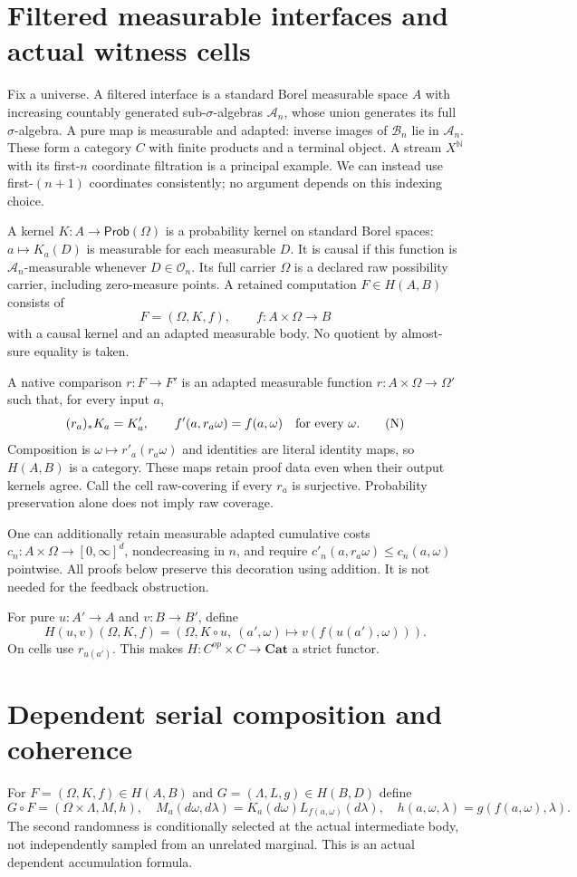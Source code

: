 \documentclass[11pt]{article}
\newcommand{\Prob}{\mathsf{Prob}}
\begin{document}
\section{Filtered measurable interfaces and actual witness cells}
Fix a universe. A filtered interface is a standard Borel measurable space $A$ with increasing countably generated sub-$\sigma$-algebras $\mathcal A_n$, whose union generates its full $\sigma$-algebra. A pure map is measurable and adapted: inverse images of $\mathcal B_n$ lie in $\mathcal A_n$. These form a category $C$ with finite products and a terminal object. A stream $X^{\mathbb N}$ with its first-$n$ coordinate filtration is a principal example. We can instead use first-$(n+1)$ coordinates consistently; no argument depends on this indexing choice.

A kernel $K:A\to\Prob(\Omega)$ is a probability kernel on standard Borel spaces: $a\mapsto K_a(D)$ is measurable for each measurable $D$. It is causal if this function is $\mathcal A_n$-measurable whenever $D\in\mathcal O_n$. Its full carrier $\Omega$ is a declared raw possibility carrier, including zero-measure points. A retained computation $F\in H(A,B)$ consists of
\[
 F=(\Omega,K,f),\qquad f:A\times\Omega\longrightarrow B
\]
with a causal kernel and an adapted measurable body. No quotient by almost-sure equality is taken.

A native comparison $r:F\to F'$ is an adapted measurable function
$r:A\times\Omega\to\Omega'$ such that, for every input $a$,
\[
 (r_a)_*K_a=K'_a,\qquad f'(a,r_a\omega)=f(a,\omega)\quad\hbox{for every }\omega.
\tag{N}
\]
Composition is $\omega\mapsto r'_a(r_a\omega)$ and identities are literal identity maps, so $H(A,B)$ is a category. These maps retain proof data even when their output kernels agree. Call the cell raw-covering if every $r_a$ is surjective. Probability preservation alone does not imply raw coverage.

One can additionally retain measurable adapted cumulative costs $c_n:A\times\Omega\to[0,\infty]^d$, nondecreasing in $n$, and require $c'_n(a,r_a\omega)\le c_n(a,\omega)$ pointwise. All proofs below preserve this decoration using addition. It is not needed for the feedback obstruction.

For pure $u:A'\to A$ and $v:B\to B'$, define
\[
 H(u,v)(\Omega,K,f)=(\Omega,K\circ u,\ (a',\omega)\mapsto v(f(u(a'),\omega))).
\]
On cells use $r_{u(a')}$. This makes $H:C^{op}\times C\to\mathbf{Cat}$ a strict functor.

\section{Dependent serial composition and coherence}
For $F=(\Omega,K,f)\in H(A,B)$ and $G=(\Lambda,L,g)\in H(B,D)$ define
\[
 G\circ F=(\Omega\times\Lambda,M,h),\quad
 M_a(d\omega,d\lambda)=K_a(d\omega)L_{f(a,\omega)}(d\lambda),
 \quad h(a,\omega,\lambda)=g(f(a,\omega),\lambda).
\tag{S}
\]
The second randomness is conditionally selected at the actual intermediate body, not independently sampled from an unrelated marginal. This is an actual dependent accumulation formula.
\end{document}

